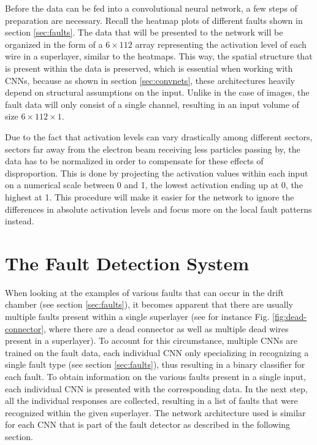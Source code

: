 Before the data can be fed into a convolutional neural network, a few
steps of preparation are necessary. Recall the heatmap plots of
different faults shown in section \ref{sec:faults}. The data that will
be presented to the network will be organized in the form of a \(6
\times 112\) array representing the activation level of each wire in a
superlayer, similar to the heatmaps. This way, the spatial structure
that is present within the data is preserved, which is essential when
working with CNNs, because as shown in section \ref{sec:convnets},
these architectures heavily depend on structural assumptions on the
input. Unlike in the case of images, the fault data will only consist
of a single channel, resulting in an input volume of size \(6
\times 112 \times 1\).

Due to the fact that activation levels can vary drastically among
different sectors, sectors far away from the electron beam receiving
less particles passing by, the data has to be normalized in order to
compensate for these effects of disproportion. This is done by projecting
the activation values within each input on a numerical scale between 0
and 1, the lowest activation ending up at 0, the highest at 1. This
procedure will make it easier for the network to ignore the
differences in absolute activation levels and focus more on the local
fault patterns instead.

\section{The Fault Detection System}

When looking at the examples of various faults that can occur in the
drift chamber (see section \ref{sec:faults}), it becomes apparent that
there are usually multiple faults present within a single
superlayer (see for instance Fig. \ref{fig:dead-connector}, where
there are a dead connector as well as multiple dead wires present in a
superlayer). To account for this circumstance, multiple CNNs are
trained on the fault data, each individual CNN only specializing in
recognizing a single fault type (see section \ref{sec:faults}), thus
resulting in a binary classifier for each fault. To obtain information
on the various faults present in a single input, each individual CNN
is presented with the corresponding data. In the next step, all the
individual responses are collected, resulting in a list of faults that
were recognized within the given superlayer. The network architecture
used is similar for each CNN that is part of the fault detector as
described in the following section.

